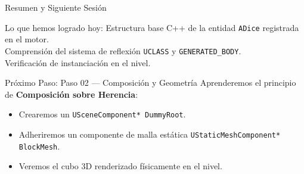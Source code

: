 \documentclass[aspectratio=169, 10pt]{beamer}
\begin{document}
\begin{frame}{Resumen y Siguiente Sesión}
    \begin{block}{Lo que hemos logrado hoy:}
        \checkmark Estructura base C++ de la entidad \texttt{ADice} registrada en el motor.\\
        \checkmark Comprensión del sistema de reflexión \texttt{UCLASS} y \texttt{GENERATED\_BODY}.\\
        \checkmark Verificación de instanciación en el nivel.
    \end{block}

    \vspace{0.4cm}
    \begin{exampleblock}{Próximo Paso: Paso 02 — Composición y Geometría}
        Aprenderemos el principio de \textbf{Composición sobre Herencia}:
        \begin{itemize}
            \item Crearemos un \texttt{USceneComponent* DummyRoot}.
            \item Adheriremos un componente de malla estática \texttt{UStaticMeshComponent* BlockMesh}.
            \item Veremos el cubo 3D renderizado físicamente en el nivel.
        \end{itemize}
    \end{exampleblock}
\end{frame}
\end{document}
